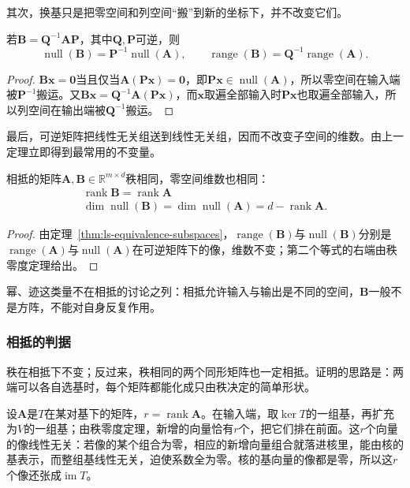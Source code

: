 其次，换基只是把零空间和列空间“搬”到新的坐标下，并不改变它们。
\begin{theorem}[相抵下的零空间与列空间]
\label{thm:ls-equivalence-subspaces}
若$\bm B=\bm Q^{-1}\bm A\bm P$，其中$\bm Q,\bm P$可逆，则
\[
 \operatorname{null}(\bm B)=\bm P^{-1}\operatorname{null}(\bm A),\qquad
 \operatorname{range}(\bm B)=\bm Q^{-1}\operatorname{range}(\bm A).
\]
\end{theorem}
\begin{proof}
$\bm B\bm x=\bm0$当且仅当$\bm A(\bm P\bm x)=\bm0$，即$\bm P\bm x\in\operatorname{null}(\bm A)$，所以零空间在输入端被$\bm P^{-1}$搬运。又$\bm B\bm x=\bm Q^{-1}\bm A(\bm P\bm x)$，而$\bm x$取遍全部输入时$\bm P\bm x$也取遍全部输入，所以列空间在输出端被$\bm Q^{-1}$搬运。
\end{proof}

最后，可逆矩阵把线性无关组送到线性无关组，因而不改变子空间的维数。由上一定理立即得到最常用的不变量。
\begin{theorem}[相抵保持秩]
\label{thm:ls-equivalence-invariants}
相抵的矩阵$\bm A,\bm B\in\mathbb R^{m\times d}$秩相同，零空间维数也相同：
\begin{equation}
\begin{gathered}
\operatorname{rank}\bm B=\operatorname{rank}\bm A\\
\dim\operatorname{null}(\bm B)=\dim\operatorname{null}(\bm A)=d-\operatorname{rank}\bm A.
\end{gathered}
\label{eq:ls-equivalence-invariants}
\end{equation}
\end{theorem}
\begin{proof}
由定理~\ref{thm:ls-equivalence-subspaces}，$\operatorname{range}(\bm B)$与$\operatorname{null}(\bm B)$分别是$\operatorname{range}(\bm A)$与$\operatorname{null}(\bm A)$在可逆矩阵下的像，维数不变；第二个等式的右端由秩零度定理给出。
\end{proof}

幂、迹这类量不在相抵的讨论之列：相抵允许输入与输出是不同的空间，$\bm B$一般不是方阵，不能对自身反复作用。

\subsubsection{相抵的判据}
\label{sec:ls-equivalence-conditions}
秩在相抵下不变；反过来，秩相同的两个同形矩阵也一定相抵。证明的思路是：两端可以各自选基时，每个矩阵都能化成只由秩决定的简单形状。

设$\bm A$是$T$在某对基下的矩阵，$r=\operatorname{rank}\bm A$。在输入端，取$\ker T$的一组基，再扩充为$V$的一组基；由秩零度定理，新增的向量恰有$r$个，把它们排在前面。这$r$个向量的像线性无关：若像的某个组合为零，相应的新增向量组合就落进核里，能由核的基表示，而整组基线性无关，迫使系数全为零。核的基向量的像都是零，所以这$r$个像还张成$\operatorname{im}T$。

